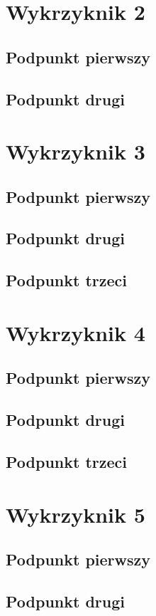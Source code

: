 \documentclass[a4paper,12pt]{article}
\begin{document}
    \section{Wykrzyknik 2}
    	\subsection{Podpunkt pierwszy}
    	\subsection{Podpunkt drugi}
    \section{Wykrzyknik 3}
    	\subsection{Podpunkt pierwszy}
    	\subsection{Podpunkt drugi}
    	\subsection{Podpunkt trzeci}
    \section{Wykrzyknik 4}
    	\subsection{Podpunkt pierwszy}
    	\subsection{Podpunkt drugi}
    	\subsection{Podpunkt trzeci}
    \section{Wykrzyknik 5}
    	\subsection{Podpunkt pierwszy}
    	\subsection{Podpunkt drugi}
\end{document}

